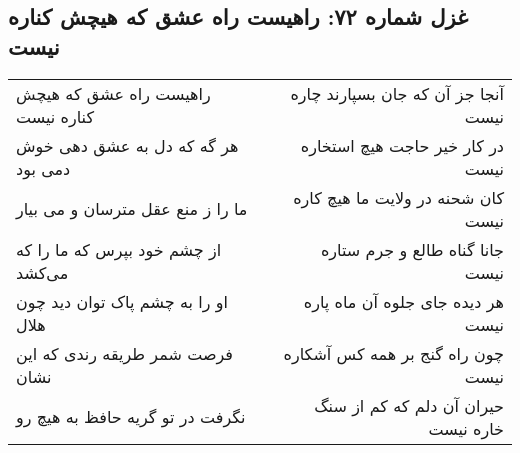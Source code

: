 \begin{center}
\section*{غزل شماره ۷۲: راهیست راه عشق که هیچش کناره نیست}
\label{sec:sh072}
\begin{longtable}{l p{0.5cm} r}
راهیست راه عشق که هیچش کناره نیست
&&
آنجا جز آن که جان بسپارند چاره نیست
\\
هر گه که دل به عشق دهی خوش دمی بود
&&
در کار خیر حاجت هیچ استخاره نیست
\\
ما را ز منع عقل مترسان و می بیار
&&
کان شحنه در ولایت ما هیچ کاره نیست
\\
از چشم خود بپرس که ما را که می‌کشد
&&
جانا گناه طالع و جرم ستاره نیست
\\
او را به چشم پاک توان دید چون هلال
&&
هر دیده جای جلوه آن ماه پاره نیست
\\
فرصت شمر طریقه رندی که این نشان
&&
چون راه گنج بر همه کس آشکاره نیست
\\
نگرفت در تو گریه حافظ به هیچ رو
&&
حیران آن دلم که کم از سنگ خاره نیست
\\
\end{longtable}
\end{center}
